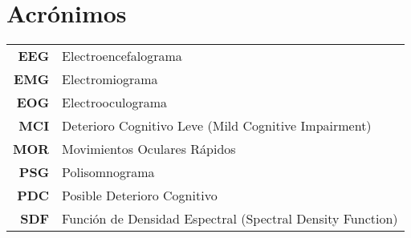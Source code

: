\documentclass[12pt,a4paper]{mitthesis}
\begin{document}


\chapter*{Acr\'onimos}

\begin{tabular}{rl}
\textbf{EEG} & Electroencefalograma %
\\
\textbf{EMG} & Electromiograma %
\\
\textbf{EOG} & Electrooculograma %
\\
\textbf{MCI} & Deterioro Cognitivo Leve (Mild Cognitive Impairment)
\\
\textbf{MOR} & Movimientos Oculares R\'apidos
\\
\textbf{PSG} & Polisomnograma %
\\
\textbf{PDC} & Posible Deterioro Cognitivo
\\
\textbf{SDF} & Funci\'on de Densidad Espectral (Spectral Density Function)
\end{tabular}

\newpage


\tableofcontents
\newpage
\end{document}
